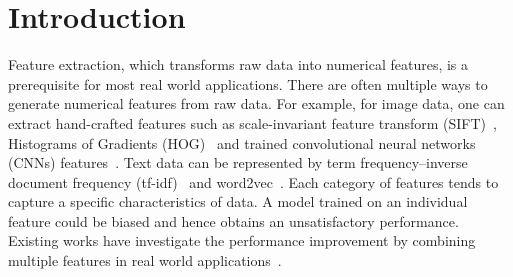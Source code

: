 \documentclass[letterpaper]{article}
\def\etc{\emph{etc}}
\begin{document}
\section{Introduction}

Feature extraction, which transforms raw data into numerical features, is a prerequisite for most real world applications.
There are often multiple ways to generate numerical features from raw data.
For example, for image data, one can extract hand-crafted features such as scale-invariant feature transform
(SIFT)~\cite{loweijcv2004distinctive}, Histograms of Gradients (HOG)~\cite{dalalcvpr2005histograms} and trained convolutional neural networks (CNNs) features~\cite{krizhevskynips2012imagenet}.
Text data can be represented by term frequency–inverse document frequency (tf-idf)~\cite{manning2008introduction} and word2vec~\cite{mikoloviclr2013efficient}.
Each category of features tends to capture a specific characteristics of data.
A model trained on an individual feature could be biased and hence obtains an unsatisfactory performance.
Existing works have investigate the performance improvement by combining multiple features in real world applications~\cite{gehler2009feature,ye2012robust,xuiccv2013feature,lai2015learning}.





\end{document}
